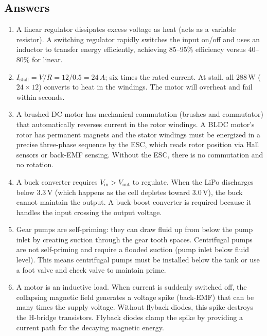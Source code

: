 \subsection{Answers}

\begin{enumerate}[leftmargin=1.5em]
  \item A linear regulator dissipates excess voltage as heat (acts as a variable resistor). A switching regulator rapidly switches the input on/off and uses an inductor to transfer energy efficiently, achieving 85--95\% efficiency versus 40--80\% for linear.

  \item $I_{\text{stall}} = V/R = 12/0.5 = 24\,A$; six times the rated current. At stall, all 288\,W ($24 \times 12$) converts to heat in the windings. The motor will overheat and fail within seconds.

  \item A brushed DC motor has mechanical commutation (brushes and commutator) that automatically reverses current in the rotor windings. A BLDC motor's rotor has permanent magnets and the stator windings must be energized in a precise three-phase sequence by the ESC, which reads rotor position via Hall sensors or back-EMF sensing. Without the ESC, there is no commutation and no rotation.

  \item A buck converter requires $V_{\text{in}} > V_{\text{out}}$ to regulate. When the LiPo discharges below 3.3\,V (which happens as the cell depletes toward 3.0\,V), the buck cannot maintain the output. A buck-boost converter is required because it handles the input crossing the output voltage.

  \item Gear pumps are self-priming: they can draw fluid up from below the pump inlet by creating suction through the gear tooth spaces. Centrifugal pumps are not self-priming and require a flooded suction (pump inlet below fluid level). This means centrifugal pumps must be installed below the tank or use a foot valve and check valve to maintain prime.

  \item A motor is an inductive load. When current is suddenly switched off, the collapsing magnetic field generates a voltage spike (back-EMF) that can be many times the supply voltage. Without flyback diodes, this spike destroys the H-bridge transistors. Flyback diodes clamp the spike by providing a current path for the decaying magnetic energy.


\end{enumerate}
